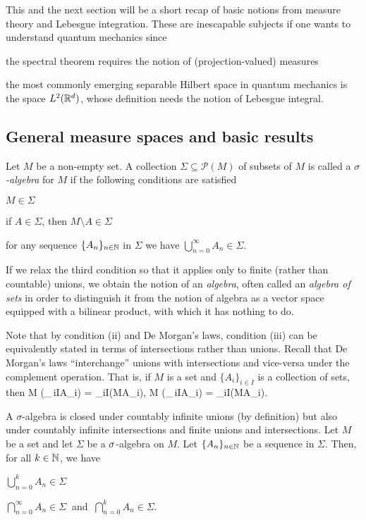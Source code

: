 
This and the next section will be a short recap of basic notions from measure theory and Lebesgue integration. These are inescapable subjects if one wants to understand quantum mechanics since
\ben[label=(\roman*)]
\item the spectral theorem requires the notion of (projection-valued) measures
\item the most commonly emerging separable Hilbert space in quantum mechanics is the space $L^2(\mathbb{R}^d)$, whose definition needs the notion of Lebesgue integral.
\een

\subsection{General measure spaces and basic results}

\bd
Let $M$ be a non-empty set. A collection $\Sigma\subseteq\mathscr{P}(M)
$ of subsets of $M$ is called a \emph{$\sigma$-algebra} for $M$ if the following conditions are satisfied
\ben[label=(\roman*)]
\item $M\in \Sigma$
\item if $A\in \Sigma$, then $M\setminus A \in \Sigma$
\item for any sequence $\{A_n\}_{n\in \mathbb{N}}$ in $\Sigma$ we have $\bigcup_{n=0}^{\infty}A_n\in\Sigma$.
\een
\ed

\br
If we relax the third condition so that it applies only to finite (rather than countable) unions, we obtain the notion of an \emph{algebra}, often called an \emph{algebra of sets} in order to distinguish it from the notion of algebra as a vector space equipped with a bilinear product, with which it has nothing to do. 
\er

\br
Note that by condition (ii) and De Morgan's laws, condition (iii) can be equivalently stated in terms of intersections rather than unions. Recall that De Morgan's laws ``interchange'' unions with intersections and vice-versa under the complement operation. That is, if $M$ is a set and $\{A_i\}_{i\in I}$ is a collection of sets, then
\bse
M \setminus \biggl(\bigcup_{\,i\in I}A_i\biggr) = \bigcap_{i\in I}(M\setminus A_i),\qquad \quad
M \setminus \biggl(\bigcap_{\,i\in I}A_i\biggr) = \bigcup_{i\in I}(M\setminus A_i).
\ese
\er

A $\sigma$-algebra is closed under countably infinite unions (by definition) but also under countably infinite intersections and finite unions and intersections.
\bp
Let $M$ be a set and let $\Sigma$ be a $\sigma$-algebra on $M$. Let $\{ A_n \}_{n\in \mathbb{N}}$ be a sequence in $\Sigma$. Then, for all $k\in \mathbb{N}$, we have
\ben[label=(\roman*)]
\item $\bigcup_{n=0}^k{A_n} \in \Sigma$
\item $\bigcap_{n=0}^{\infty}{A_n} \in \Sigma \ $ and $\ \bigcap_{n=0}^k{A_n} \in \Sigma$.
\een
\ep

